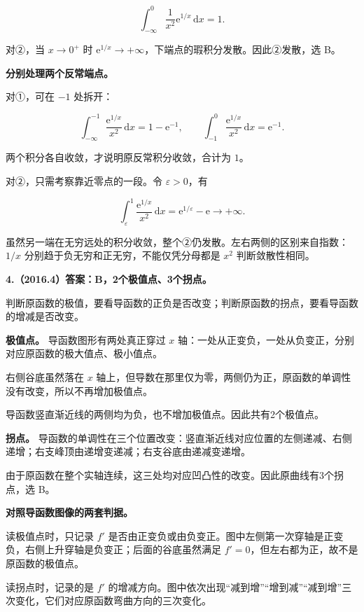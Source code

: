 \documentclass[UTF8,11pt,fontset=windows]{ctexart}
\begin{document}
$$
\int_{-\infty}^0\frac1{x^2}\mathrm e^{1/x}\,\mathrm dx=1.
$$

对②，当 $x\to0^+$ 时 $\mathrm e^{1/x}\to+\infty$，下端点的瑕积分发散。因此②发散，选 B。

\textbf{分别处理两个反常端点。}

对①，可在 $-1$ 处拆开：

$$
\int_{-\infty}^{-1}\frac{\mathrm e^{1/x}}{x^2}\,\mathrm dx
=1-\mathrm e^{-1},
\qquad
\int_{-1}^{0}\frac{\mathrm e^{1/x}}{x^2}\,\mathrm dx=\mathrm e^{-1}.
$$

两个积分各自收敛，才说明原反常积分收敛，合计为 $1$。

对②，只需考察靠近零点的一段。令 $\varepsilon>0$，有

$$
\int_{\varepsilon}^{1}\frac{\mathrm e^{1/x}}{x^2}\,\mathrm dx
=\mathrm e^{1/\varepsilon}-\mathrm e\longrightarrow+\infty.
$$

虽然另一端在无穷远处的积分收敛，整个②仍发散。左右两侧的区别来自指数：$1/x$ 分别趋于负无穷和正无穷，不能仅凭分母都是 $x^2$ 判断敛散性相同。

\clearpage

\textbf{4.（2016.4）答案：B，2个极值点、3个拐点。}

判断原函数的极值，要看导函数的正负是否改变；判断原函数的拐点，要看导函数的增减是否改变。

\textbf{极值点。} 导函数图形有两处真正穿过 $x$ 轴：一处从正变负，一处从负变正，分别对应原函数的极大值点、极小值点。

右侧谷底虽然落在 $x$ 轴上，但导数在那里仅为零，两侧仍为正，原函数的单调性没有改变，所以不再增加极值点。

导函数竖直渐近线的两侧均为负，也不增加极值点。因此共有2个极值点。

\textbf{拐点。} 导函数的单调性在三个位置改变：竖直渐近线对应位置的左侧递减、右侧递增；右支峰顶由递增变递减；右支谷底由递减变递增。

由于原函数在整个实轴连续，这三处均对应凹凸性的改变。因此原曲线有3个拐点，选 B。

\textbf{对照导函数图像的两套判据。}

读极值点时，只记录 $f'$ 是否由正变负或由负变正。图中左侧第一次穿轴是正变负，右侧上升穿轴是负变正；后面的谷底虽然满足 $f'=0$，但左右都为正，故不是原函数的极值点。

读拐点时，记录的是 $f'$ 的增减方向。图中依次出现“减到增”“增到减”“减到增”三次变化，它们对应原函数弯曲方向的三次变化。
\end{document}
